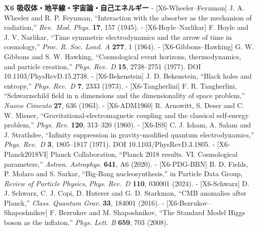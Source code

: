 \documentclass[
  a4paper,
]{ltjsarticle}
\begin{document}
\textbf{X6 吸収体・地平線・宇宙論・自己エネルギー} -
{[}X6-Wheeler--Feynman{]} J. A. Wheeler and R. P. Feynman, ``Interaction
with the absorber as the mechanism of radiation,'' \emph{Rev.~Mod.
Phys.} \textbf{17}, 157 (1945). - {[}X6-Hoyle--Narlikar{]} F. Hoyle and
J. V. Narlikar, ``Time symmetric electrodynamics and the arrow of time
in cosmology,'' \emph{Proc. R. Soc. Lond. A} \textbf{277}, 1 (1964). -
{[}X6-Gibbons--Hawking{]} G. W. Gibbons and S. W. Hawking,
``Cosmological event horizons, thermodynamics, and particle creation,''
\emph{Phys. Rev.~D} \textbf{15}, 2738--2751 (1977). DOI
10.1103/PhysRevD.15.2738. - {[}X6-Bekenstein{]} J. D. Bekenstein,
``Black holes and entropy,'' \emph{Phys. Rev.~D} \textbf{7}, 2333
(1973). - {[}X6-Tangherlini{]} F. R. Tangherlini, ``Schwarzschild field
in n dimensions and the dimensionality of space problem,'' \emph{Nuovo
Cimento} \textbf{27}, 636 (1963). - {[}X6-ADM1960{]} R. Arnowitt, S.
Deser and C. W. Misner, ``Gravitational-electromagnetic coupling and the
classical self-energy problem,'' \emph{Phys. Rev.} \textbf{120},
313--320 (1960). - {[}X6-ISS{]} C. J. Isham, A. Salam and J. Strathdee,
``Infinity suppression in gravity-modified quantum electrodynamics,''
\emph{Phys. Rev.~D} \textbf{3}, 1805--1817 (1971). DOI
10.1103/PhysRevD.3.1805. - {[}X6-Planck2018VI{]} Planck Collaboration,
``Planck 2018 results. VI. Cosmological parameters,'' \emph{Astron.
Astrophys.} \textbf{641}, A6 (2020). - {[}X6-PDG-BBN{]} B. D. Fields, P.
Molaro and S. Sarkar, ``Big-Bang nucleosynthesis,'' in Particle Data
Group, \emph{Review of Particle Physics}, \emph{Phys. Rev.~D}
\textbf{110}, 030001 (2024). - {[}X6-Schwarz{]} D. J. Schwarz, C. J.
Copi, D. Huterer and G. D. Starkman, ``CMB anomalies after Planck,''
\emph{Class. Quantum Grav.} \textbf{33}, 184001 (2016). -
{[}X6-Bezrukov--Shaposhnikov{]} F. Bezrukov and M. Shaposhnikov, ``The
Standard Model Higgs boson as the inflaton,'' \emph{Phys. Lett. B}
\textbf{659}, 703 (2008).
\end{document}
